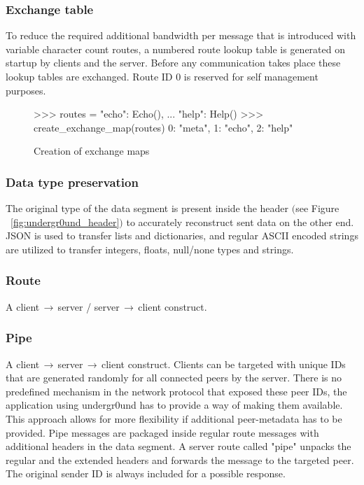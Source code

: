 \documentclass[conference]{IEEEtran}
\begin{document}
\subsubsection{Exchange table}
To reduce the required additional bandwidth per message that is introduced with variable character count routes, a numbered route lookup table is generated on startup by clients and the server. Before any communication takes place these lookup tables are exchanged. Route ID 0 is reserved for self management purposes.

\begin{figure}[H]
\centering
\begin{python}
>>> routes = {"echo": Echo(),
...    "help": Help()}
>>> create_exchange_map(routes)
{0: "meta", 1: "echo", 2: "help"}
\end{python}
\caption{Creation of exchange maps}
\end{figure}

\subsubsection{Data type preservation}
The original type of the data segment is present inside the header $($see Figure ~\ref{fig:undergr0und_header}$)$ to accurately reconstruct sent data on the other end. JSON\cite{JSON:T. Bray Ed.} is used to transfer lists and dictionaries, and regular ASCII encoded strings are utilized to transfer integers, floats, null/none types and strings.

\subsubsection{Route}
A client$\,\to\,$server / server$\,\to\,$client construct.

\subsubsection{Pipe}
A client$\,\to\,$server$\,\to\,$client construct. Clients can be targeted with unique IDs that are generated randomly for all connected peers by the server. There is no predefined mechanism in the network protocol that exposed these peer IDs, the application using undergr0und\cite{undergr0und:Philip Trauner} has to provide a way of making them available. This approach allows for more flexibility if additional peer-metadata has to be provided.
Pipe messages are packaged inside regular route messages with additional headers in the data segment. A server route called {\color{deepgreen}"pipe"} unpacks the regular and the extended headers and forwards the message to the targeted peer. The original sender ID is always included for a possible response.
\end{document}
